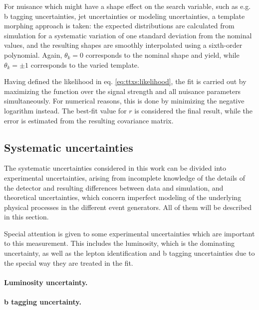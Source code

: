 For nuisance which might have a shape effect on the search variable, such as e.g. b tagging uncertainties, jet uncertainties or modeling uncertainties, a template morphing approach is taken: the expected distributions are calculated from simulation for a systematic variation of one standard deviation from the nominal values, and the resulting shapes are smoothly interpolated using a sixth-order polynomial. Again, $\theta_k = 0$ corresponds to the nominal shape and yield, while $\theta_k = \pm 1$ corresponds to the varied template. 

Having defined the likelihood in eq. \ref{eq:ttxs:likelihood}, the fit is carried out by maximizing the function over the signal strength and all nuisance parameters simultaneously. For numerical reasons, this is done by minimizing the negative logarithm instead. The best-fit value for $r$ is considered the final result, while the error is estimated from the resulting covariance matrix. 

\subsection{Systematic uncertainties}


The systematic uncertainties considered in this work can be divided into experimental uncertainties, arising from incomplete knowledge of the details of the detector and resulting differences between data and simulation, and theoretical uncertainties, which concern imperfect modeling of the underlying physical processes in the different event generators. All of them will be described in this section.

Special attention is given to some experimental uncertainties which are important to this measurement. This includes the luminosity, which is the dominating uncertainty, as well as the lepton identification and b tagging uncertainties due to the special way they are treated in the fit.

\paragraph{Luminosity uncertainty.}


\paragraph{b tagging uncertainty.}

